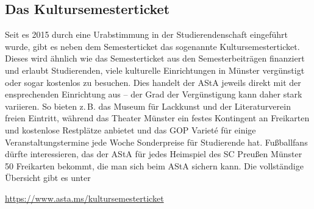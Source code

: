 
\subsection{Das Kultursemesterticket}
Seit es 2015 durch eine Urabstimmung in der Studierendenschaft eingeführt wurde, gibt es neben dem Semesterticket das sogenannte Kultursemesterticket. Dieses wird ähnlich wie das Semesterticket aus den Semesterbeiträgen finanziert und erlaubt Studierenden, viele kulturelle Einrichtungen in Münster vergünstigt oder sogar kostenlos zu besuchen. Dies handelt der AStA jeweils direkt mit der ensprechenden Einrichtung aus – der Grad der Vergünstigung kann daher stark variieren. So bieten z.\,B. das Museum für Lackkunst und der Literaturverein freien Eintritt, während das Theater Münster ein festes Kontingent an Freikarten und kostenlose Restplätze anbietet und das GOP Variet\'e für einige Veranstaltungstermine jede Woche Sonderpreise für Studierende hat. Fußballfans dürfte interessieren, das der AStA für jedes Heimspiel des SC Preußen Münster 50 Freikarten bekommt, die man sich beim AStA sichern kann.
Die vollständige Übersicht gibt es unter
\vspace{-1ex}
\begin{center}
	\url{https://www.asta.ms/kultursemesterticket}
\end{center}

\smallskip
